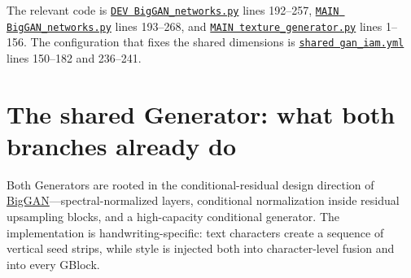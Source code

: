 \documentclass[10pt,a4paper]{article}
\newcommand{\code}[2]{\href{#1}{\texttt{#2}}}
\newcommand{\paper}[2]{\href{#1}{#2}}
\newcommand{\srcmainG}{\code{https://github.com/rquq/HGGAN_test/blob/main/networks/BigGAN_networks.py}{MAIN BigGAN\_networks.py}}
\newcommand{\srcdevG}{\code{https://github.com/rquq/HGGAN_test/blob/dev/networks/BigGAN_networks.py}{DEV BigGAN\_networks.py}}
\newcommand{\srctexture}{\code{https://github.com/rquq/HGGAN_test/blob/main/networks/texture_generator.py}{MAIN texture\_generator.py}}
\newcommand{\srccfg}{\code{https://github.com/rquq/HGGAN_test/blob/dev/configs/gan_iam.yml}{shared gan\_iam.yml}}
\begin{document}
The relevant code is \srcdevG{} lines 192--257, \srcmainG{} lines 193--268, and \srctexture{} lines 1--156.  The configuration that fixes the shared dimensions is \srccfg{} lines 150--182 and 236--241.

\section{The shared Generator: what both branches already do}

Both Generators are rooted in the conditional-residual design direction of \paper{https://arxiv.org/abs/1809.11096}{BigGAN}---spectral-normalized layers, conditional normalization inside residual upsampling blocks, and a high-capacity conditional generator.  The implementation is handwriting-specific: text characters create a sequence of vertical seed strips, while style is injected both into character-level fusion and into every GBlock.
\end{document}
